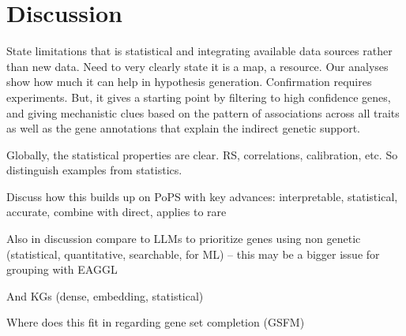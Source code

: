 \section{Discussion}

State limitations that is statistical and integrating available data sources rather than new data. Need to very clearly state it is a map, a resource. Our analyses show how much it can help in hypothesis generation. Confirmation requires experiments. But, it gives a starting point by filtering to high confidence genes, and giving mechanistic clues based on the pattern of associations across all traits as well as the gene annotations that explain the indirect genetic support.

Globally, the statistical properties are clear. RS, correlations, calibration, etc. So distinguish examples from statistics.

Discuss how this builds up on PoPS with key advances: interpretable, statistical, accurate, combine with direct, applies to rare

Also in discussion compare to LLMs to prioritize genes using non genetic (statistical, quantitative, searchable, for ML) -- this may be a bigger issue for grouping with EAGGL

And KGs (dense, embedding, statistical)

Where does this fit in regarding gene set completion (GSFM)